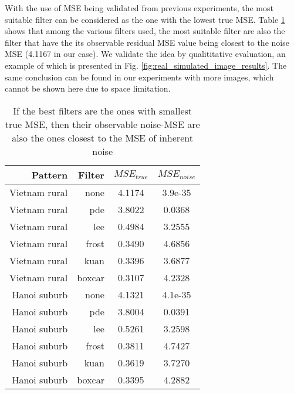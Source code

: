 \documentclass[journal]{IEEEtran}
\begin{document}
With the use of MSE being validated from previous experiments, 
	the most suitable filter can be considered as the one with the lowest true MSE.
Table \ref{tab:mse_true_noise_log_domain} shows that among the various filters used, 
	the most suitable filter are also the filter that 
		have the its observable residual MSE value being closest to the noise MSE (4.1167 in our case).
We validate the idea by qualititative evaluation, an example of which is presented in Fig. \ref{fig:real_simulated_image_results}.
The same conclusion can be found in our experiments with more images, which cannot be shown here due to space limitation.

\begin{table}
\centering
\begin{tabular}{r|r|c|c}
Pattern  & Filter  & $MSE_{true}$   & $MSE_{noise}$      \\%
\hline
Vietnam rural	& none		& 4.1174	& 3.9e-35\\
Vietnam rural	& pde			& 3.8022	& 0.0368\\
Vietnam rural	& lee			& 0.4984	& 3.2555\\
Vietnam rural	& frost		& 0.3490	& 4.6856\\
Vietnam rural	& kuan		& 0.3396	& 3.6877\\
Vietnam rural	& boxcar	& 0.3107	& 4.2328\\
\hline
Hanoi suburb	& none		& 4.1321	& 4.1e-35\\
Hanoi suburb	& pde			& 3.8004	& 0.0391\\
Hanoi suburb	& lee			& 0.5261	& 3.2598\\
Hanoi suburb	& frost		& 0.3811	& 4.7427\\
Hanoi suburb	& kuan		& 0.3619	& 3.7270\\
Hanoi suburb	& boxcar	& 0.3395	& 4.2882\\
\hline
\end{tabular}

\caption{If the best filters are the ones with smallest true MSE, then their observable noise-MSE are also the ones closest to the MSE of inherent noise}
\label{tab:mse_true_noise_log_domain}
\end{table}
\end{document}
